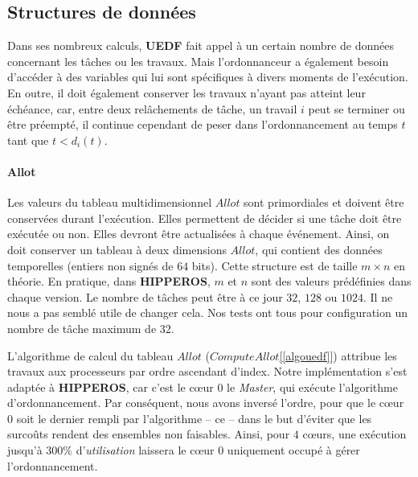 	\subsection{Structures de données}
		Dans ses nombreux calculs, \textbf{UEDF} fait appel à un certain nombre de données concernant les tâches ou les travaux.
		Mais l'ordonnanceur a également besoin d'accéder à des variables qui lui sont 
		spécifiques à divers moments de l'exécution. 
		En outre, il doit également conserver les travaux n'ayant pas atteint leur échéance, 
		car, entre deux relâchements de tâche, un travail $i$ peut se terminer ou être préempté, 
		il continue cependant de \og{}peser\fg{} dans l'ordonnancement au temps $t$ tant que $t < d_i(t)$.
		\newline
				
		\paragraph{Allot}
		Les valeurs du tableau multidimensionnel $Allot$ sont primordiales et doivent être conservées durant l'exécution.
		Elles permettent de décider si une tâche doit être exécutée ou non.
		Elles devront être actualisées à chaque événement.
		Ainsi, on doit conserver un tableau à deux dimensions $Allot$, qui contient des données 
		temporelles (entiers non signés de $64$ bits). 
		Cette structure est de taille $m \times n$ en théorie. 
		En pratique, dans \textbf{HIPPEROS}, $m$ et $n$ sont des valeurs prédéfinies 
		dans chaque version. Le nombre de tâches peut être à ce jour $32$, $128$ ou $1024$.
		Il ne nous a pas semblé utile de changer cela. Nos tests ont tous pour configuration 
		un nombre de tâche maximum de 32. 
		\newline
		
		L'algorithme de calcul du tableau $Allot$ (\hyperref[algouedf]{$Compute Allot$[\ref*{algouedf}]}) attribue les travaux
		aux processeurs par ordre ascendant d'index. Notre implémentation s'est adaptée à \textbf{HIPPEROS}, car c'est le 
		cœur $0$ le \textit{Master}, qui exécute l'algorithme d'ordonnancement. Par conséquent, 
		nous avons inversé l'ordre, pour que le cœur $0$ soit le dernier \og{}rempli\fg{} par l'algorithme -- 
		ce -- dans le but d'éviter que les surcoûts rendent des ensembles non faisables. Ainsi, 
		pour $4$ cœurs, une exécution jusqu'à $300\%$ d'\textit{utilisation} laissera le cœur $0$ 
		uniquement occupé à gérer l'ordonnancement.
		
